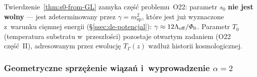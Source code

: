 \begin{remark}%
\label{rem:O22-partial-closure}
Twierdzenie~\ref{thm:s0-from-GL} zamyka cz\k{e}\'s\'c problemu~O22:
parametr $s_0$ \textbf{nie jest wolny} --- jest zdeterminowany
przez $\gamma = m_{\mathrm{sp}}^2$, kt\'ore jest ju\.z
wyznaczone z~warunku ci\k{e}mnej energii
(\S\ref{ssec:de-potencjal}): $\gamma \approx 12\Lambda_{\mathrm{eff}}/\varPhi_0$.
Parametr $T_0$ (temperatura substratu w~przesz\l{}o\'sci)
pozostaje otwartym zadaniem (O22 cz\k{e}\'s\'c~II),
adresowanym przez ewolucj\k{e} $T_\Gamma(z)$ wzd\l{}u\.z
historii kosmologicznej.
\end{remark}

\subsubsection{Geometryczne sprz\k{e}\.zenie wi\k{a}za\'n
  i~wyprowadzenie $\alpha = 2$}%
\label{app:B-geo-coupling}

